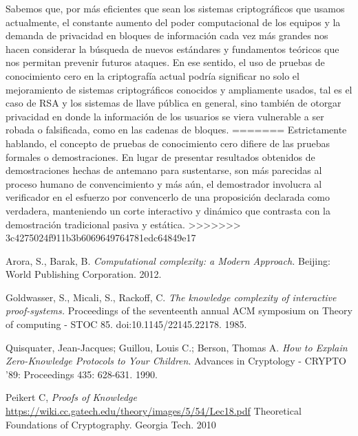 \documentclass[oneside,10pt]{article}
\begin{document}
Sabemos que, por más eficientes que sean los sistemas criptográficos que usamos actualmente, el constante aumento del poder computacional de los equipos y la demanda de privacidad en bloques de información cada vez más grandes nos hacen considerar la búsqueda de nuevos estándares y fundamentos teóricos que nos permitan prevenir futuros ataques.  En ese sentido, el uso de pruebas de conocimiento cero en la criptografía actual podría significar no solo el mejoramiento de sistemas criptográficos conocidos y ampliamente usados, tal es el caso de RSA y los sistemas de llave pública en general, sino también de otorgar privacidad en donde la información de los usuarios se viera vulnerable a ser robada o falsificada, como en las cadenas de bloques. 
=======
  Estrictamente hablando, el concepto de  pruebas de conocimiento cero difiere de las pruebas formales o demostraciones. En lugar de presentar resultados obtenidos de demostraciones hechas de antemano para
  sustentarse, son más parecidas al proceso humano de convencimiento y más aún, el demostrador
  involucra al verificador en el esfuerzo por convencerlo de una proposición declarada como verdadera, manteniendo un corte interactivo y dinámico que contrasta con la demostración tradicional pasiva y estática. 
>>>>>>> 3c4275024f911b3b6069649764781edc64849e17
\begin{thebibliography}{99}

  Arora, S.,  Barak, B. 
  \emph{Computational complexity: a Modern Approach.}
  Beijing: World Publishing Corporation.
  2012.

  Goldwasser, S., Micali, S.,  Rackoff, C.
  \emph{The knowledge complexity of interactive proof-systems.}
  Proceedings of the seventeenth annual ACM symposium on Theory of computing - STOC 85.
  doi:10.1145/22145.22178.
  1985.

  Quisquater, Jean-Jacques; Guillou, Louis C.; Berson, Thomas A.
  \emph{How to Explain Zero-Knowledge Protocols to Your Children}.
  Advances in Cryptology - CRYPTO '89:
  Proceedings 435: 628-631.
  1990.

  Peikert C,
  \emph{Proofs of Knowledge}
  \href{https://wiki.cc.gatech.edu/theory/images/5/54/Lec18.pdf}
  {https://wiki.cc.gatech.edu/theory/images/5/54/Lec18.pdf}
  Theoretical Foundations of Cryptography.
  Georgia Tech.
  2010
\end{thebibliography}
\end{document}

